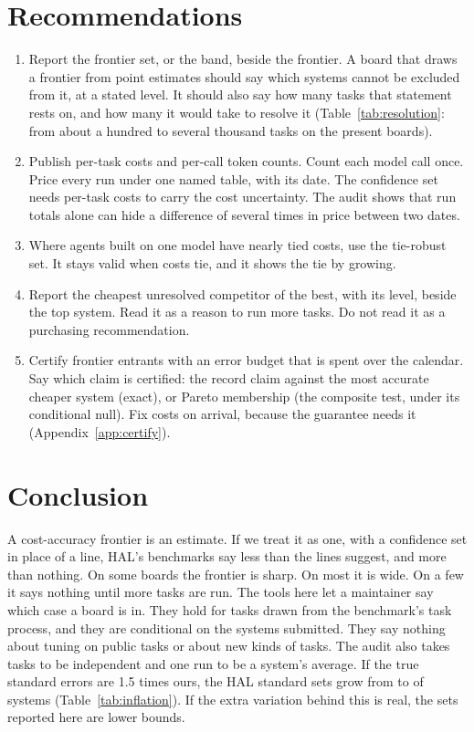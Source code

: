 \documentclass[11pt]{article}
\begin{document}
\section{Recommendations}
\begin{enumerate}
\item Report the frontier set, or the band, beside the frontier. A board that draws a frontier from point estimates should say which systems cannot be excluded from it, at a stated level. It should also say how many tasks that statement rests on, and how many it would take to resolve it (Table~\ref{tab:resolution}: from about a hundred to several thousand tasks on the present boards).
\item Publish per-task costs and per-call token counts. Count each model call once. Price every run under one named table, with its date. The confidence set needs per-task costs to carry the cost uncertainty. The audit shows that run totals alone can hide a difference of several times in price between two dates.
\item Where agents built on one model have nearly tied costs, use the tie-robust set. It stays valid when costs tie, and it shows the tie by growing.
\item Report the cheapest unresolved competitor of the best, with its level, beside the top system. Read it as a reason to run more tasks. Do not read it as a purchasing recommendation.
\item Certify frontier entrants with an error budget that is spent over the calendar. Say which claim is certified: the record claim against the most accurate cheaper system (exact), or Pareto membership (the composite test, under its conditional null). Fix costs on arrival, because the guarantee needs it (Appendix~\ref{app:certify}).
\end{enumerate}

\section{Conclusion}
A cost-accuracy frontier is an estimate. If we treat it as one, with a confidence set in place of a line, HAL's benchmarks say less than the lines suggest, and more than nothing. On some boards the frontier is sharp. On most it is wide. On a few it says nothing until more tasks are run. The tools here let a maintainer say which case a board is in. They hold for tasks drawn from the benchmark's task process, and they are conditional on the systems submitted. They say nothing about tuning on public tasks or about new kinds of tasks. The audit also takes tasks to be independent and one run to be a system's average. If the true standard errors are 1.5 times ours, the HAL standard sets grow from \NumInflHalSetOne{} to \NumInflHalSetOneFive{} of \NumInflHalSystems{} systems (Table~\ref{tab:inflation}). If the extra variation behind this is real, the sets reported here are lower bounds.
\end{document}
